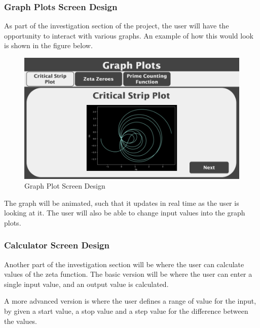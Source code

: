 \documentclass{article}
\begin{document}
\clearpage

\subsubsection{Graph Plots Screen Design}

As part of the investigation section of the project, the user will have the opportunity to interact with various graphs. An example of how this would look is shown in the figure below.

\begin{figure}[ht]
    \centering
    \includegraphics[scale=0.18]{graph-plots-screen-design}
    \caption{Graph Plot Screen Design}
\end{figure}

The graph will be animated, such that it updates in real time as the user is looking at it. The user will also be able to change input values into the graph plots.

\subsubsection{Calculator Screen Design}

Another part of the investigation section will be where the user can calculate values of the zeta function. The basic version will be where the user can enter a single input value, and an output value is calculated.

A more advanced version is where the user defines a range of value for the input, by given a start value, a stop value and a step value for the difference between the values.
\end{document}
